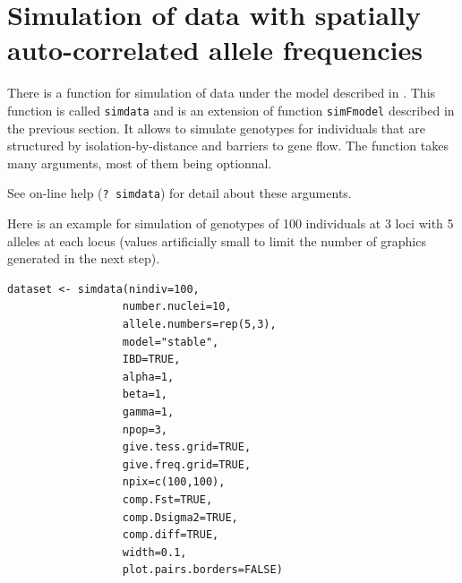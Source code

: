\documentclass[a4paper,10pt]{article}
\begin{document}
\clearpage
\section[ Spatially correlated frequencies]{Simulation of data with spatially auto-correlated allele frequencies }\label{sim-IBD}

There is a function for simulation of data under the model described in \citep{Guillot09a}. 
This function is called {\tt simdata} and is an extension of function {\tt simFmodel} described in the previous section. It allows to simulate 
genotypes for individuals that are structured by isolation-by-distance and barriers to gene flow.
The function takes many arguments, most of them being optionnal. 


See on-line help ({\tt ? simdata}) for detail about these arguments.

Here is an example for simulation of genotypes of 100 individuals at 3 loci with 5 alleles at each locus 
(values artificially small to limit the number of graphics generated in the next step). 

\begin{verbatim}
dataset <- simdata(nindiv=100,
                  number.nuclei=10,
                  allele.numbers=rep(5,3),
                  model="stable",
                  IBD=TRUE,
                  alpha=1,
                  beta=1,
                  gamma=1,
                  npop=3,
                  give.tess.grid=TRUE,
                  give.freq.grid=TRUE,
                  npix=c(100,100),
                  comp.Fst=TRUE,
                  comp.Dsigma2=TRUE,
                  comp.diff=TRUE,
                  width=0.1,
                  plot.pairs.borders=FALSE)
\end{verbatim}
\end{document}

